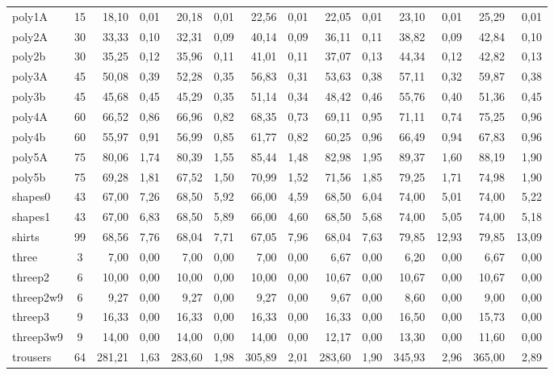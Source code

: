 \documentclass[12pt, openright, twoside, a4paper, english, brazilian]{USPSC-classe/USPSC}
\newcommand{\lgray}{\cellcolor{lightgray}}
\begin{document}
\begin{adjustwidth}{-2cm}{-2.5 cm}
\begin{threeparttable}[!htb]
{\begin{tabular}{|l|c|rr|rr|rr|rr|rr|rr|}
            poly1A &15  &\lgray18,10 &0,01  &20,18 &0,01  &22,56 &0,01  &22,05 &0,01  &23,10 &0,01  &25,29 &0,01 \\
            poly2A &30  &33,33 &0,10  &\lgray32,31 &0,09  &40,14 &0,09  &36,11 &0,11  &38,82 &0,09  &42,84 &0,10 \\
            poly2b &30  &\lgray35,25 &0,12  &35,96 &0,11  &41,01 &0,11  &37,07 &0,13  &44,34 &0,12  &42,82 &0,13 \\
            poly3A &45  &50,08 &0,39  &52,28 &0,35  &56,83 &0,31  &53,63 &0,38  &57,11 &0,32  &59,87 &0,38 \\
            poly3b &45  &45,68 &0,45  &\lgray45,29 &0,35  &51,14 &0,34  &48,42 &0,46  &55,76 &0,40  &51,36 &0,45 \\
            poly4A &60  &66,52 &0,86  &66,96 &0,82  &68,35 &0,73  &69,11 &0,95  &71,11 &0,74  &75,25 &0,96 \\
            poly4b &60  &\lgray55,97 &0,91  &56,99 &0,85  &61,77 &0,82  &60,25 &0,96  &66,49 &0,94  &67,83 &0,96 \\
            poly5A &75  &\lgray80,06 &1,74  &80,39 &1,55  &85,44 &1,48  &82,98 &1,95  &89,37 &1,60  &88,19 &1,90 \\
            poly5b &75  &69,28 &1,81  &\lgray67,52 &1,50  &70,99 &1,52  &71,56 &1,85  &79,25 &1,71  &74,98 &1,90 \\
            shapes0 &43  &67,00 &7,26  &68,50 &5,92  &\lgray66,00 &4,59  &68,50 &6,04  &74,00 &5,01  &74,00 &5,22 \\
            shapes1 &43  &67,00 &6,83  &68,50 &5,89  &\lgray66,00 &4,60  &68,50 &5,68  &74,00 &5,05  &74,00 &5,18 \\
            shirts &99  &68,56 &7,76  &68,04 &7,71  &\lgray67,05 &7,96  &68,04 &7,63  &79,85 &12,93  &79,85 &13,09 \\
            three &3  &7,00 &0,00  &7,00 &0,00  &7,00 &0,00  &6,67 &0,00  &\lgray6,20 &0,00  &6,67 &0,00 \\
            threep2 &6  &\lgray10,00 &0,00  &\lgray10,00 &0,00  &\lgray10,00 &0,00  &10,67 &0,00  &10,67 &0,00  &10,67 &0,00 \\
            threep2w9 &6  &9,27 &0,00  &9,27 &0,00  &9,27 &0,00  &9,67 &0,00  &\lgray8,60 &0,00  &9,00 &0,00 \\
            threep3 &9  &16,33 &0,00  &16,33 &0,00  &16,33 &0,00  &16,33 &0,00  &16,50 &0,00  &\lgray15,73 &0,00 \\
            threep3w9 &9  &14,00 &0,00  &14,00 &0,00  &14,00 &0,00  &12,17 &0,00  &13,30 &0,00  &\lgray11,60 &0,00 \\
            trousers &64  &\lgray281,21 &1,63  &283,60 &1,98  &305,89 &2,01  &283,60 &1,90  &345,93 &2,96  &365,00 &2,89 \\
            \hline
        \end{tabular}
    }
    \label{tab:t1}
\end{threeparttable}\end{adjustwidth}
\end{document}
